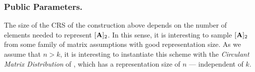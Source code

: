 \subsubsection{Public Parameters.} The size of the CRS of the construction above depends on the number of elements needed to represent $[\mathbf{{A}}]_2$. In this sense, it is interesting to sample $[\mathbf{{A}}]_2$ from some family of matrix assumptions with good representation size. As we assume that $n>k$, it is interesting to instantiate this scheme with the \textit{Circulant Matrix Distribution} of \cite{EPRINT:MorRafVil15}, which has a representation size of $n$ --- independent of $k$. 



 


